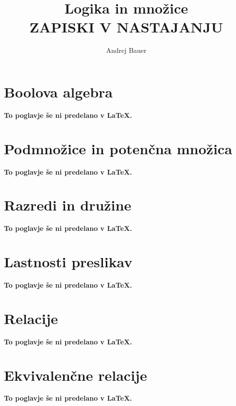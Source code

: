 \documentclass[11pt,a4paper]{book}
\author{Andrej Bauer}
\title{Logika in množice \\ ZAPISKI V NASTAJANJU}
\begin{document}
\maketitle

\cleardoublepage

\pagestyle{fancyplain}

{
\renewcommand{\markboth}[2]{}
\tableofcontents
}

\cleardoublepage












\chapter{Boolova algebra}
\textbf{To poglavje še ni predelano v {\LaTeX}.}
%

\chapter{Podmnožice in potenčna množica}
\textbf{To poglavje še ni predelano v {\LaTeX}.}
%

\chapter{Razredi in družine}
\textbf{To poglavje še ni predelano v {\LaTeX}.}
%

\chapter{Lastnosti preslikav}
\textbf{To poglavje še ni predelano v {\LaTeX}.}
%

\chapter{Relacije}
\textbf{To poglavje še ni predelano v {\LaTeX}.}
%

\chapter{Ekvivalenčne relacije}
\textbf{To poglavje še ni predelano v {\LaTeX}.}
%
\end{document}
